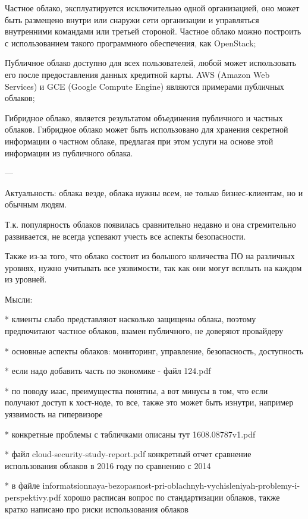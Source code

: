 
Частное облако, эксплуатируется исключительно одной организацией, оно может быть размещено внутри или снаружи сети организации и управляться внутренними командами или третьей стороной.
Частное облако можно построить с использованием такого программного обеспечения, как OpenStack;

Публичное облако доступно для всех пользователей, любой может использовать его после предоставления данных кредитной карты.
AWS (Amazon Web Services) и GCE (Google Compute Engine) являются примерами публичных облаков;

Гибридное облако, является результатом объединения публичного и частных облаков.
Гибридное облако может быть использовано для хранения секретной информации о частном облаке, предлагая при этом услуги на основе этой информации из публичного облака.






---

Актуальность: облака везде, облака нужны всем, не только бизнес-клиентам, но и обычным людям.

Т.к. популярность облаков появилась сравнительно недавно и она стремительно развивается, не всегда успевают учесть все аспекты безопасности.

Также из-за того, что облако состоит из большого количества ПО на различных уровнях, нужно учитывать все уязвимости, так как они могут всплыть на каждом из уровней.

Мысли:

* клиенты слабо представляют насколько защищены облака, поэтому предпочитают частное облаков, взамен публичного, не доверяют провайдеру

* основные аспекты облаков: мониторинг, управление, безопасность, доступность

* если надо добавить часть по экономике - файл 124.pdf

* по поводу иаас, преимущества понятны, а вот минусы в том, что если получают доступ к хост-ноде, то все, также это может быть изнутри, например уязвимость на гипервизоре

* конкретные проблемы с табличками описаны тут 1608.08787v1.pdf

* файл cloud-security-study-report.pdf конкретный отчет сравнение использования облаков в 2016 году по сравнению с 2014

* в файле informatsionnaya-bezopasnost-pri-oblachnyh-vychisleniyah-problemy-i-perspektivy.pdf хорошо расписан вопрос по стандартизации облаков, также кратко написано про риски использования облаков

